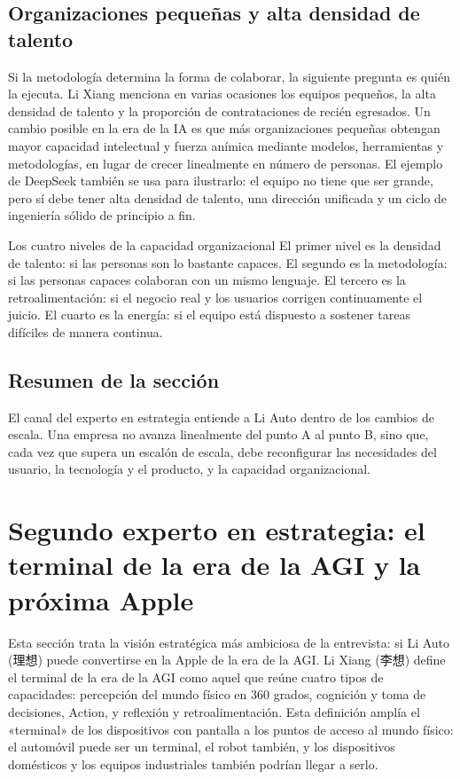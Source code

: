 \documentclass[a4paper]{article}
\begin{document}
\subsection{Organizaciones pequeñas y alta densidad de talento}

Si la metodología determina la forma de colaborar, la siguiente pregunta es quién la ejecuta. Li Xiang menciona en varias ocasiones los equipos pequeños, la alta densidad de talento y la proporción de contrataciones de recién egresados. Un cambio posible en la era de la IA es que más organizaciones pequeñas obtengan mayor capacidad intelectual y fuerza anímica mediante modelos, herramientas y metodologías, en lugar de crecer linealmente en número de personas. El ejemplo de DeepSeek también se usa para ilustrarlo: el equipo no tiene que ser grande, pero sí debe tener alta densidad de talento, una dirección unificada y un ciclo de ingeniería sólido de principio a fin.

\begin{importantbox}{Los cuatro niveles de la capacidad organizacional}
El primer nivel es la densidad de talento: si las personas son lo bastante capaces. El segundo es la metodología: si las personas capaces colaboran con un mismo lenguaje. El tercero es la retroalimentación: si el negocio real y los usuarios corrigen continuamente el juicio. El cuarto es la energía: si el equipo está dispuesto a sostener tareas difíciles de manera continua.
\end{importantbox}

\subsection{Resumen de la sección}

El canal del experto en estrategia entiende a Li Auto dentro de los cambios de escala. Una empresa no avanza linealmente del punto A al punto B, sino que, cada vez que supera un escalón de escala, debe reconfigurar las necesidades del usuario, la tecnología y el producto, y la capacidad organizacional.
\section{Segundo experto en estrategia: el terminal de la era de la AGI y la próxima Apple}

Esta sección trata la visión estratégica más ambiciosa de la entrevista: si Li Auto (理想) puede convertirse en la Apple de la era de la AGI. Li Xiang (李想) define el terminal de la era de la AGI como aquel que reúne cuatro tipos de capacidades: percepción del mundo físico en 360 grados, cognición y toma de decisiones, Action, y reflexión y retroalimentación. Esta definición amplía el «terminal» de los dispositivos con pantalla a los puntos de acceso al mundo físico: el automóvil puede ser un terminal, el robot también, y los dispositivos domésticos y los equipos industriales también podrían llegar a serlo.
\end{document}
